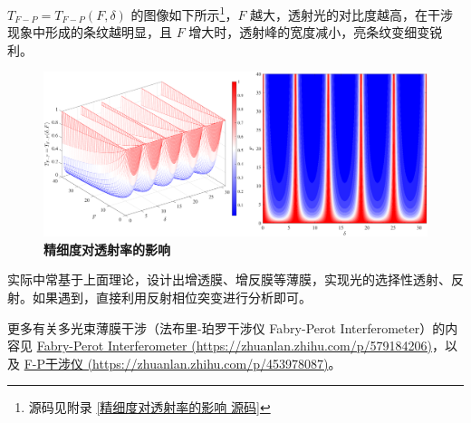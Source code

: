 \documentclass[UTF8]{report}
\theoremstyle{MyLineTheoremStyle} %
\theoremstyle{MyBlockTheoremStyle} %
\theoremstyle{MySubsubsectionStyle} %
\begin{document}
$T_{F-P} = T_{F-P}(F, \delta)$ 的图像如下所示\footnote{源码见附录 \ref{精细度对透射率的影响 源码}}，$F$ 越大，透射光的对比度越高，在干涉现象中形成的条纹越明显，且 $F$ 增大时，透射峰的宽度减小，亮条纹变细变锐利。

\begin{figure}[H]\centering
\includegraphics[width=\columnwidth]{assets/3/精细度对透射率的影响.pdf}
\caption{\bfseries 精细度对透射率的影响}\label{精细度对透射率的影响}
\end{figure}

实际中常基于上面理论，设计出增透膜、增反膜等薄膜，实现光的选择性透射、反射。如果遇到，直接利用反射相位突变进行分析即可。

更多有关多光束薄膜干涉（法布里-珀罗干涉仪 Fabry-Perot Interferometer）的内容见 \href{https://zhuanlan.zhihu.com/p/579184206}{Fabry-Perot Interferometer (https://zhuanlan.zhihu.com/p/579184206)}，以及 \href{https://zhuanlan.zhihu.com/p/453978087}{F-P干涉仪 (https://zhuanlan.zhihu.com/p/453978087)}。

\end{document}
